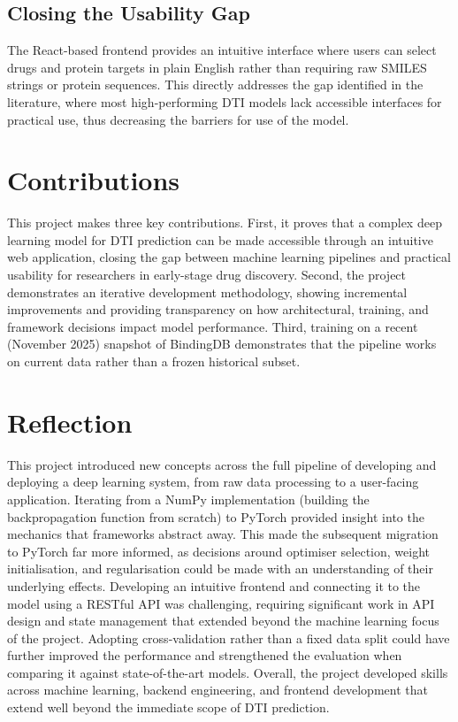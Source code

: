 \subsection{Closing the Usability Gap}
\label{subsec:closing-the-usability-gap}
The React-based frontend provides an intuitive interface where users can select drugs and protein targets in plain English rather than requiring raw SMILES strings or protein sequences.
This directly addresses the gap identified in the literature, where most high-performing DTI models lack accessible interfaces for practical use, thus decreasing the barriers for use of the model.

\section{Contributions}
This project makes three key contributions.
First, it proves that a complex deep learning model for DTI prediction can be made accessible through an intuitive web application, closing the gap between machine learning pipelines and practical usability for researchers in early-stage drug discovery.
Second, the project demonstrates an iterative development methodology, showing incremental improvements and providing transparency on how architectural, training, and framework decisions impact model performance.
Third, training on a recent (November 2025) snapshot of BindingDB demonstrates that the pipeline works on current data rather than a frozen historical subset.

\section{Reflection}
\label{sec:reflection}
This project introduced new concepts across the full pipeline of developing and deploying a deep learning system, from raw data processing to a user-facing application.
Iterating from a NumPy implementation (building the backpropagation function from scratch) to PyTorch provided insight into the mechanics that frameworks abstract away.
This made the subsequent migration to PyTorch far more informed, as decisions around optimiser selection, weight initialisation, and regularisation could be made with an understanding of their underlying effects.
Developing an intuitive frontend and connecting it to the model using a RESTful API was challenging, requiring significant work in API design and state management that extended beyond the machine learning focus of the project.
Adopting cross-validation rather than a fixed data split could have further improved the performance and strengthened the evaluation when comparing it against state-of-the-art models.
Overall, the project developed skills across machine learning, backend engineering, and frontend development that extend well beyond the immediate scope of DTI prediction.

